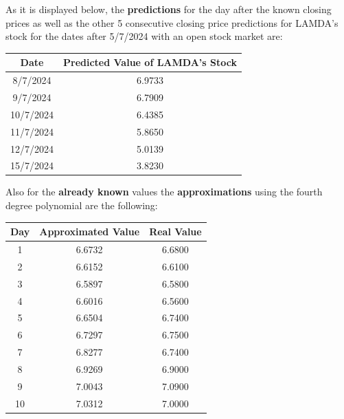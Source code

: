\documentclass{article}
\begin{document}
\begin{itemize}
    As it is displayed below, the \textbf{predictions} for the day after the known closing prices as well as the other 5 consecutive closing price predictions for LAMDA's stock for the dates after 5/7/2024 with an open stock market are:
    \begin{center}
    \begin{tabular}{|c|c|}
        \hline
        \textbf{Date} & \textbf{Predicted Value of LAMDA's Stock} \\
        \hline
        8/7/2024 & 6.9733 \\
        9/7/2024 & 6.7909 \\
        10/7/2024 & 6.4385 \\
        11/7/2024 & 5.8650 \\
        12/7/2024 & 5.0139 \\
        15/7/2024 & 3.8230 \\
        \hline
    \end{tabular}
\end{center}


Also for the \textbf{already known} values the \textbf{approximations} using the fourth degree polynomial are the following:
\begin{center}
    
    
    \centering
    \begin{tabular}{@{}ccc@{}}
        \toprule
        \textbf{Day} & \textbf{Approximated Value} & \textbf{Real Value} \\ \midrule
        1 & 6.6732 & 6.6800 \\
        2 & 6.6152 & 6.6100 \\
        3 & 6.5897 & 6.5800 \\
        4 & 6.6016 & 6.5600 \\
        5 & 6.6504 & 6.7400 \\
        6 & 6.7297 & 6.7500 \\
        7 & 6.8277 & 6.7400 \\
        8 & 6.9269 & 6.9000 \\
        9 & 7.0043 & 7.0900 \\
        10 & 7.0312 & 7.0000 \\ \bottomrule
    \end{tabular}
    \end{center}
\end{itemize}
    
   
\end{document}
